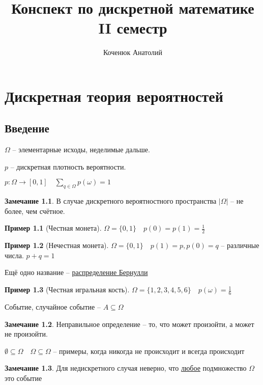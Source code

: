 \documentclass{book}
\author{Коченюк Анатолий}
\title{Конспект по дискретной математике\\ II семестр}
\renewcommand\O{\ensuremath{\emptyset}}
\theoremstyle{definition}
\newtheorem*{note}{Замечание}
\newtheorem*{example}{Пример}
\begin{document}
    \maketitle
    \chapter{Дискретная теория вероятностей}
    \section{Введение}

    \begin{definition}
        $ $\\
        $\Omega$ -- элементарные исходы, неделимые дальше.

         $p$ -- дискретная плотность вероятности.

         $p: \Omega \to [0,1]\quad \sum\limits_{q\in \Omega} p(\omega) = 1$
    \end{definition}

    \begin{note}
        В случае дискретного вероятностного пространства $\left| \Omega \right| $ -- не более, чем счётное.
    \end{note}

    \begin{example}
        [Честная монета]
        $\Omega = \{0,1\}\quad p(0) = p(1) = \frac{1}{2}$
    \end{example}

    \begin{example}
        [Нечестная монета]
        $\Omega = \{0,1\}\quad p(1) = p, p(0) = q$ -- различные числа. $p+q = 1$

        Ещё одно название -- \underline{распределение Бернулли}
    \end{example}

    \begin{example}
        [Честная игральная кость]
        $\Omega = \{1, 2, 3, 4, 5, 6\}\quad p(\omega) = \frac{1}{6}$
    \end{example}

    \begin{definition}
        Событие, случайное событие -- $A\subseteq \Omega$
    \end{definition}

    \begin{note}
        Неправильное определение -- то, что может произойти, а может не произойти.

            $\O \subseteq \Omega\quad \Omega\subseteq \Omega$ -- примеры, когда никогда не происходит и всегда происходит
    \end{note}
    \begin{note}
        Для недискретного случая неверно, что \underline{любое} подмножество $\Omega$ это событие
    \end{note}
\end{document}
